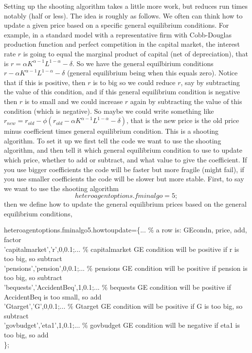 Setting up the shooting algorithm takes a little more work, but reduces run times notably (half or less). The idea is roughly as follows. We often can think how to update a given price based on a specific general equilibrium conditions. For example, in a standard model with a representative firm with Cobb-Douglas production function and perfect competition in the capital market, the interest rate $r$ is going to equal the marginal product of capital (net of depreciation), that is $r=\alpha K^{\alpha-1} L^{1-\alpha}-\delta$. So we have the general equilbirium conditions $r-\alpha K^{\alpha-1} L^{1-\alpha}-\delta$ (general equilibrium being when this equals zero). Notice that if this is positive, then $r$ is to big so we could reduce $r$, say by subtracting the value of this condition, and if this general equilibrium condition is negative then $r$ is to small and we could increase $r$ again by subtracting the value of this condition (which is negative). So maybe we could write something like $r_{new}=r_{old}-\phi (r_{old}-\alpha K^{\alpha-1} L^{1-\alpha}-\delta)$, that is the new price is the old price minus coefficient times general equilibrium condition. This is a shooting algorithm. To set it up we first tell the code we want to use the shooting algorithm, and then tell it which general equilibrium condition to use to update which price, whether to add or subtract, and what value to give the coefficient. If you use bigger coefficients the code will be faster but more fragile (might fail), if you use smaller coefficients the code will be slower but more stable. First, to say we want to use the shooting algorithm
\begin{equation*}
 heteroagentoptions.fminalgo=5;
\end{equation*}
then we define how to update the general equilibrium prices based on the general equilibrium conditions,
\begin{table}[h!]
\footnotesize
heteroagentoptions.fminalgo5.howtoupdate=\{...  \% a row is: GEcondn, price, add, factor \\
\phantom{aaa} 'capitalmarket','r',0,0.1;...  \% capitalmarket GE condition will be positive if r is too big, so subtract \\
\phantom{aaa} 'pensions','pension',0,0.1;... \% pensions GE condition will be positive if pension is too big, so subtract \\
\phantom{aaa} 'bequests','AccidentBeq',1,0.1;... \% bequests GE condition will be positive if AccidentBeq is too small, so add \\
\phantom{aaa} 'Gtarget','G',0,0.1;... \% Gtarget GE condition will be positive if G is too big, so subtract \\
\phantom{aaa} 'govbudget','eta1',1,0.1;... \% govbudget GE condition will be negative if eta1 is too big, so add \\
    \};
\end{table}
